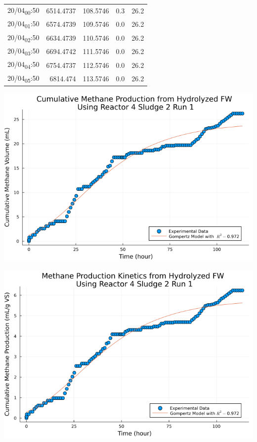 \documentclass[11pt]{article}
\begin{document}
\begin{center}
\begin{tabular}{lrrrr}
20/04\textsubscript{00}:50 & 6514.4737 & 108.5746 & 0.3 & 26.2\\[0pt]
20/04\textsubscript{01}:50 & 6574.4739 & 109.5746 & 0.0 & 26.2\\[0pt]
20/04\textsubscript{02}:50 & 6634.4739 & 110.5746 & 0.0 & 26.2\\[0pt]
20/04\textsubscript{03}:50 & 6694.4742 & 111.5746 & 0.0 & 26.2\\[0pt]
20/04\textsubscript{04}:50 & 6754.4737 & 112.5746 & 0.0 & 26.2\\[0pt]
20/04\textsubscript{05}:50 & 6814.474 & 113.5746 & 0.0 & 26.2\\[0pt]
\end{tabular}
\end{center}

\begin{center}
\includegraphics[width=.9\linewidth]{../plots/BMPs/Hydrolyzed FW/methane_kinetics_hydrolysate_4_s2_r1_hour.png}
\end{center}

\begin{center}
\includegraphics[width=.9\linewidth]{../plots/BMPs/Hydrolyzed FW/specific_methane_kinetics_hydrolysate_4_s2_r1_hour.png}
\end{center}
\end{document}
